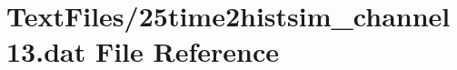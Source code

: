 \hypertarget{25time2histsim__channel13_8dat}{}\section{Text\+Files/25time2histsim\+\_\+channel13.dat File Reference}
\label{25time2histsim__channel13_8dat}
